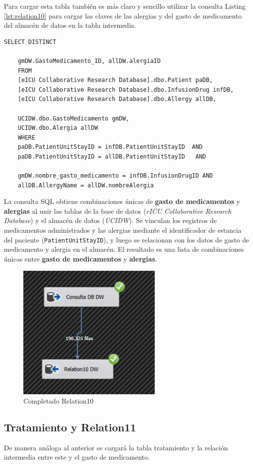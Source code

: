 \documentclass{article}
\begin{document}
	Para cargar esta tabla también es más claro y sencillo utilizar la consulta Listing \ref{lst:relation10} para cargar las claves de las alergias y del gasto de medicamento del almacén de datos en la tabla intermedia.
	\begin{lstlisting}[style=ddlstyle, label=lst:relation10,caption=Consulta para llenado de relacion 10]
		SELECT DISTINCT
	
	gmDW.GastoMedicamento_ID, allDW.alergiaID
	FROM 
	[eICU Collaborative Research Database].dbo.Patient paDB,
	[eICU Collaborative Research Database].dbo.InfusionDrug infDB,
	[eICU Collaborative Research Database].dbo.Allergy allDB,
	
	UCIDW.dbo.GastoMedicamento gmDW,
	UCIDW.dbo.Alergia allDW
	WHERE 
	paDB.PatientUnitStayID = infDB.PatientUnitStayID  AND 
	paDB.PatientUnitStayID = allDB.PatientUnitStayID   AND
	
	gmDW.nombre_gasto_medicamento = infDB.InfusionDrugID AND
	allDB.AllergyName = allDW.nombreAlergia 
	\end{lstlisting}

	La consulta SQL obtiene combinaciones únicas de \textbf{gasto de medicamentos} y \textbf{alergias} al unir las tablas de la base de datos (\textit{eICU Collaborative Research Database}) y el almacén de datos (\textit{UCIDW}). Se vinculan los registros de medicamentos administrados y las alergias mediante el identificador de estancia del paciente (\texttt{PatientUnitStayID}), y luego se relacionan con los datos de gasto de medicamento y alergia en el almacén. El resultado es una lista de combinaciones únicas entre \textbf{gasto de medicamentos} y \textbf{alergias}.
	
	
	
	
	\begin{figure}[H]
		\centering
		\includegraphics[width=.3\linewidth]{./images/completados/relation10.png}
		\caption{Completado Relation10}
	\end{figure}
	\subsection{Tratamiento y Relation11}
	De manera análoga al anterior se cargará la tabla tratamiento y la relación intermedia entre este y el gasto de medicamento.
\end{document}
